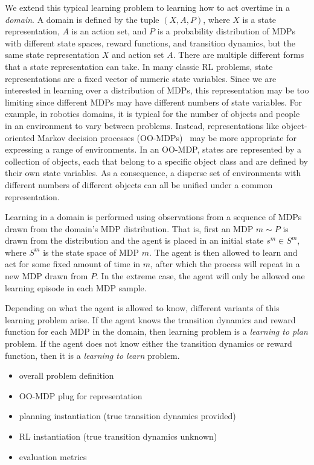 We extend this typical learning problem to learning how to act overtime in a {\em domain}. A domain is defined by the tuple $(X, A, P)$, where $X$ is a state representation, $A$ is an action set, and $P$ is a probability distribution of MDPs with different state spaces, reward functions, and transition dynamics, but the same state representation $X$ and action set $A$. There are multiple different forms that a state representation can take. In many classic RL problems, state representations are a fixed vector of numeric state variables. Since we are interested in learning over a distribution of MDPs, this representation may be too limiting since different MDPs may have different numbers of state variables. For example, in robotics domains, it is typical for the number of objects and people in an environment to vary between problems. Instead, representations like object-oriented Markov decision processes (OO-MDPs)~\cite{diuk2008object} may be more appropriate for expressing a range of environments. In an OO-MDP, states are represented by a collection of objects, each that belong to a specific object class and are defined by their own state variables. As a consequence, a disperse set of environments with different numbers of different objects can all be unified under a common representation.

Learning in a domain is performed using observations from a sequence of MDPs drawn from the domain's MDP distribution. That is, first an MDP $m \sim P$ is drawn from the distribution and the agent is placed in an initial state $s^m \in S^m$, where $S^m$ is the state space of MDP $m$. The agent is then allowed to learn and act for some fixed amount of time in $m$, after which the process will repeat in a new MDP drawn from $P$. In the extreme case, the agent will only be allowed one learning episode in each MDP sample.

Depending on what the agent is allowed to know, different variants of this learning problem arise. If the agent knows the transition dynamics and reward function for each MDP in the domain, then learning problem is a {\em learning to plan} problem. If the agent does not know either the transition dynamics or reward function, then it is a {\em learning to learn} problem.

\begin{itemize}
\item overall problem definition
\item OO-MDP plug for representation
\item planning instantiation (true transition dynamics provided)
\item RL instantiation (true transition dynamics unknown)
\item evaluation metrics 
\end{itemize}

